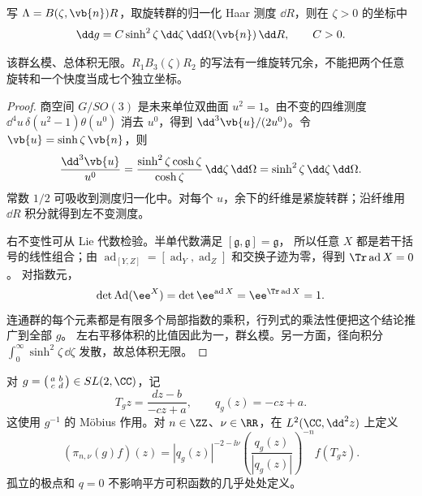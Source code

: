 \begin{proposition}
写 $\Lambda=B(\zeta,\vb{n})R$，取旋转群的归一化 Haar 测度 $\dd R$，则在 $\zeta>0$ 的坐标中
\begin{equation}
 \dd g=C\sinh^2\zeta\,\dd \zeta\,\dd \Omega(\vb{n})\,\dd R,
 \qquad C>0.
 \label{eq:haar-lorentz}
\end{equation}
\begin{samepage}
该群幺模、总体积无限。$R_1B_3(\zeta)R_2$ 的写法有一维旋转冗余，不能把两个任意旋转和一个快度当成七个独立坐标。

\end{samepage}
\end{proposition}
\begin{proof}
商空间 $G/SO(3)$ 是未来单位双曲面 $u^2=1$。由不变的四维测度 $\dd^4u\,\delta(u^2-1)\theta(u^0)$ 消去 $u^0$，得到 $\dd^3\vb{u}/(2u^0)$。令 $\vb{u}=\sinh\zeta\,\vb{n}$，则
\[
 \frac{\dd^3\vb{u}}{u^0}
 =\frac{\sinh^2\zeta\cosh\zeta}{\cosh\zeta}\,\dd \zeta\,\dd \Omega
 =\sinh^2\zeta\,\dd \zeta\,\dd \Omega.
\]
常数 $1/2$ 可吸收到测度归一化中。对每个 $u$，余下的纤维是紧旋转群；沿纤维用 $\dd R$ 积分就得到左不变测度。

右不变性可从 Lie 代数检验。半单代数满足 $[\mathfrak g,\mathfrak g]=\mathfrak g$，
所以任意 $X$ 都是若干括号的线性组合；由
$\operatorname{ad}_{[Y,Z]}=[\operatorname{ad}_Y,\operatorname{ad}_Z]$ 和交换子迹为零，得到 $\Tr\operatorname{ad}X=0$。
对指数元，
\[
\det\operatorname{Ad}(\ee^X)=\det \ee^{\operatorname{ad}X}
=\ee^{\Tr\operatorname{ad}X}=1.
\]
连通群的每个元素都是有限多个局部指数的乘积，行列式的乘法性便把这个结论推广到全部 $g$。
左右平移体积的比值因此为一，群幺模。另一方面，径向积分
$\int_0^\infty\sinh^2\zeta\,\dd \zeta$ 发散，故总体积无限。
\end{proof}

\begin{definition}[平面模型的主系列]
对 $g=\left(\begin{smallmatrix}a&b\\c&d\end{smallmatrix}\right)\in SL(2,\CC)$，记
\[
 T_gz=\frac{dz-b}{-cz+a},\qquad q_g(z)=-cz+a.
\]
这使用 $g^{-1}$ 的 M\"obius 作用。对 $n\in\ZZ$、$\nu\in\RR$，在 $L^2(\CC,\dd^2z)$ 上定义
\begin{equation}
 (\pi_{n,\nu}(g)f)(z)
 =|q_g(z)|^{-2-\ii\nu}
 \left(\frac{q_g(z)}{|q_g(z)|}\right)^{-n}f(T_gz).
 \label{eq:principal-series-action}
\end{equation}
孤立的极点和 $q=0$ 不影响平方可积函数的几乎处处定义。
\end{definition}

